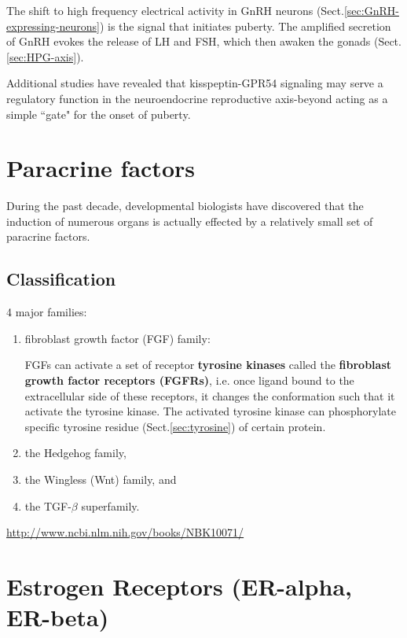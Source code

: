 The shift to high frequency electrical activity in GnRH neurons
(Sect.\ref{sec:GnRH-expressing-neurons}) is the signal that initiates puberty.
The amplified secretion of GnRH evokes the release of LH and FSH, which then
awaken the gonads (Sect.\ref{sec:HPG-axis}).


Additional studies have revealed that kisspeptin-GPR54 signaling may serve a
regulatory function in the neuroendocrine reproductive axis-beyond acting as a
simple ``gate" for the onset of puberty.

\section{Paracrine factors}
\label{sec:paracrine-factors}

During the past decade, developmental biologists have discovered that the
induction of numerous organs is actually effected by a relatively small set of
paracrine factors.

\subsection{Classification}

4 major families:
\begin{enumerate}
  \item fibroblast growth factor (FGF) family:
  
  FGFs can activate a set of receptor {\bf tyrosine kinases} called the {\bf
  fibroblast growth factor receptors (FGFRs)}, i.e. once ligand bound
  to the extracellular side of these receptors, it changes the conformation such
  that it activate the tyrosine kinase. The activated tyrosine kinase can
  phosphorylate specific tyrosine residue (Sect.\ref{sec:tyrosine}) of certain
  protein.
  
  \item the Hedgehog family, 
  
  \item the Wingless  (Wnt) family, and 
  
  \item the TGF-$\beta$ superfamily.
\end{enumerate}
\url{http://www.ncbi.nlm.nih.gov/books/NBK10071/}


\section{Estrogen Receptors (ER-alpha, ER-beta)}
\label{sec:estrogen-receptors}

